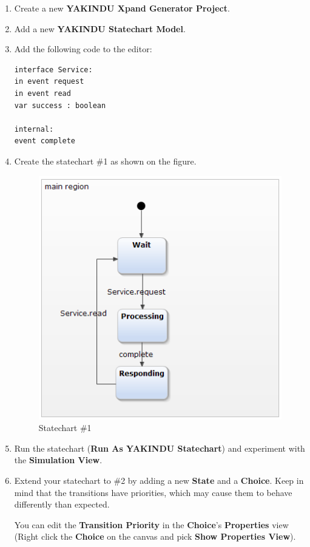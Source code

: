 \documentclass[]{report}
\let\Oldincludegraphics\includegraphics
\renewcommand{\includegraphics}[1]{
\begin{adjustbox}{max size={\textwidth}{\textheight}}
    \Oldincludegraphics[scale=0.6]{#1}%
\end{adjustbox}
}
\begin{document}
\begin{enumerate}
\def\labelenumi{\arabic{enumi}.}
\item
  Create a new \textbf{YAKINDU Xpand Generator Project}.
\item
  Add a new \textbf{YAKINDU Statechart Model}.
\item
  Add the following code to the editor:

\begin{verbatim}
interface Service:
in event request
in event read
var success : boolean

internal:
event complete
\end{verbatim}
\item
  Create the statechart \#1 as shown on the figure.

  \begin{figure}[htbp]
  \centering
  \includegraphics{img/yakindu/statechart_1.png}
  \caption{Statechart \#1}
  \end{figure}
\item
  Run the statechart (\textbf{Run As \textbar{} YAKINDU Statechart}) and
  experiment with the \textbf{Simulation View}.
\item
  Extend your statechart to \#2 by adding a new \textbf{State} and a
  \textbf{Choice}. Keep in mind that the transitions have priorities,
  which may cause them to behave differently than expected.

  You can edit the \textbf{Transition Priority} in the \textbf{Choice}'s
  \textbf{Properties} view (Right click the \textbf{Choice} on the
  canvas and pick \textbf{Show Properties View}).


\end{enumerate}
\end{document}

